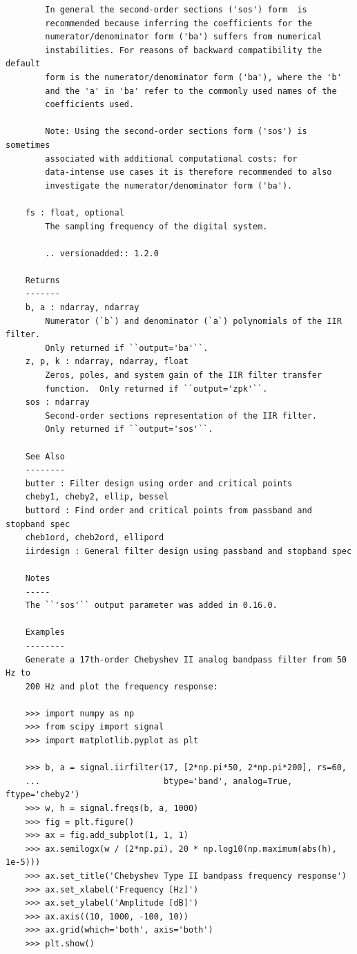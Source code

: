 \documentclass[12pt,a4paper]{article}
\begin{document}
\begin{itemize}
\begin{verbatim}
        In general the second-order sections ('sos') form  is
        recommended because inferring the coefficients for the
        numerator/denominator form ('ba') suffers from numerical
        instabilities. For reasons of backward compatibility the default
        form is the numerator/denominator form ('ba'), where the 'b'
        and the 'a' in 'ba' refer to the commonly used names of the
        coefficients used.

        Note: Using the second-order sections form ('sos') is sometimes
        associated with additional computational costs: for
        data-intense use cases it is therefore recommended to also
        investigate the numerator/denominator form ('ba').

    fs : float, optional
        The sampling frequency of the digital system.

        .. versionadded:: 1.2.0

    Returns
    -------
    b, a : ndarray, ndarray
        Numerator (`b`) and denominator (`a`) polynomials of the IIR filter.
        Only returned if ``output='ba'``.
    z, p, k : ndarray, ndarray, float
        Zeros, poles, and system gain of the IIR filter transfer
        function.  Only returned if ``output='zpk'``.
    sos : ndarray
        Second-order sections representation of the IIR filter.
        Only returned if ``output='sos'``.

    See Also
    --------
    butter : Filter design using order and critical points
    cheby1, cheby2, ellip, bessel
    buttord : Find order and critical points from passband and stopband spec
    cheb1ord, cheb2ord, ellipord
    iirdesign : General filter design using passband and stopband spec

    Notes
    -----
    The ``'sos'`` output parameter was added in 0.16.0.

    Examples
    --------
    Generate a 17th-order Chebyshev II analog bandpass filter from 50 Hz to
    200 Hz and plot the frequency response:

    >>> import numpy as np
    >>> from scipy import signal
    >>> import matplotlib.pyplot as plt

    >>> b, a = signal.iirfilter(17, [2*np.pi*50, 2*np.pi*200], rs=60,
    ...                         btype='band', analog=True, ftype='cheby2')
    >>> w, h = signal.freqs(b, a, 1000)
    >>> fig = plt.figure()
    >>> ax = fig.add_subplot(1, 1, 1)
    >>> ax.semilogx(w / (2*np.pi), 20 * np.log10(np.maximum(abs(h), 1e-5)))
    >>> ax.set_title('Chebyshev Type II bandpass frequency response')
    >>> ax.set_xlabel('Frequency [Hz]')
    >>> ax.set_ylabel('Amplitude [dB]')
    >>> ax.axis((10, 1000, -100, 10))
    >>> ax.grid(which='both', axis='both')
    >>> plt.show()


\end{verbatim}
\end{itemize}
\end{document}

